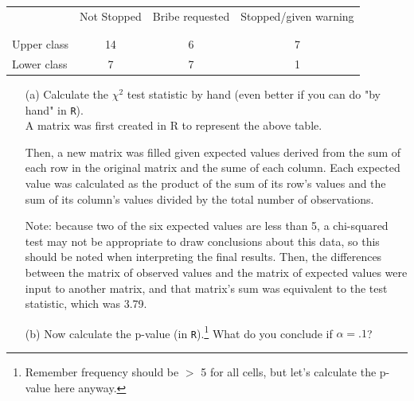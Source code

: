 \documentclass[12pt,letterpaper]{article}
\begin{document}
\newpage
\begin{table}[h!]
	\centering
	\begin{tabular}{l | c c c }
		& Not Stopped & Bribe requested & Stopped/given warning \\
		\\[-1.8ex] 
		\hline \\[-1.8ex]
		Upper class & 14 & 6 & 7 \\
		Lower class & 7 & 7 & 1 \\
		\hline
	\end{tabular}
\end{table}

\begin{enumerate}
	
	\item [(a)]
	Calculate the $\chi^2$ test statistic by hand (even better if you can do "by hand" in \texttt{R}).\\
	\vspace{.5cm}
	A matrix was first created in R to represent the above table.
	  
	\vspace{.5cm}
	Then, a new matrix was filled given expected values derived from the sum of each row in the original matrix and the sume of each column. Each expected value was calculated as the product of the sum of its row's values and the sum of its column's values divided by the total number of observations.
	 
	Note: because two of the six expected values are less than 5, a chi-squared test may not be appropriate to draw conclusions about this data, so this should be noted when interpreting the final results.
	\vspace{.5cm}
	Then, the differences between the matrix of observed values and the matrix of expected values were input to another matrix, and that matrix's sum was equivalent to the test statistic, which was 3.79.
	 
	\vspace{.5cm}
	
	\item [(b)]
	Now calculate the p-value (in \texttt{R}).\footnote{Remember frequency should be $>$ 5 for all cells, but let's calculate the p-value here anyway.}  What do you conclude if $\alpha = .1$?\\
	
	\vspace{.5cm}
	

\end{enumerate}
\end{document}

